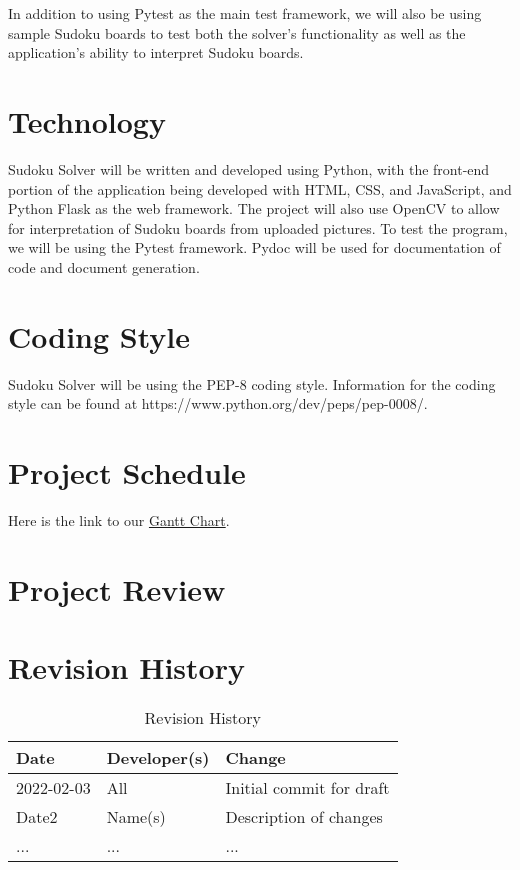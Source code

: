 \documentclass[11pt]{article}
\begin{document}
In addition to using Pytest as the main test framework, we will also be using sample Sudoku boards to test both the solver's functionality as well as the application's ability to interpret Sudoku boards.

\section{Technology}

Sudoku Solver will be written and developed using Python, with the front-end portion of the application being developed with HTML, CSS, and JavaScript, and Python Flask as the web framework. The project will also use OpenCV to allow for interpretation of Sudoku boards from uploaded pictures. To test the program, we will be using the Pytest framework. Pydoc will be used for documentation of code and document generation.

\section{Coding Style}

Sudoku Solver will be using the PEP-8 coding style. Information for the coding style can be found at https://www.python.org/dev/peps/pep-0008/. 

\section{Project Schedule}

Here is the link to our  \href{https://gitlab.cas.mcmaster.ca/bhuiyr2/sudokusolver_l02_grp08/-/blob/main/ProjectSchedule/Gantt_Sudoku.gan}{Gantt Chart}.

\section{Project Review}

\section{Revision History}
\begin{table}[hp]
\caption{Revision History} \label{TblRevisionHistory}
\begin{tabularx}{\textwidth}{llX}
\toprule
\textbf{Date} & \textbf{Developer(s)} & \textbf{Change}\\
\midrule
2022-02-03 & All & Initial commit for draft\\
Date2 & Name(s) & Description of changes\\
... & ... & ...\\
\bottomrule
\end{tabularx}
\end{table}
\end{document}
